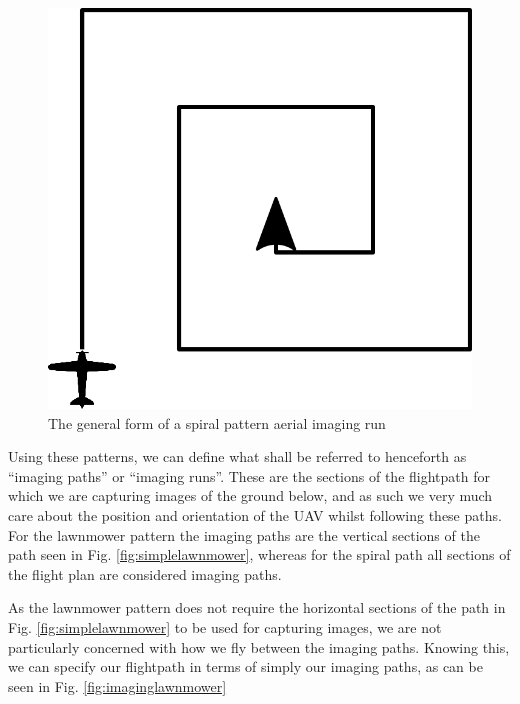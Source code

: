 \begin{figure}[htbp!] 
\centering    
\includegraphics[width=0.5\textheight]{SimpleSpiral}
\caption[Simple Spiral Pattern]{The general form of a spiral pattern aerial imaging run}
\label{fig:simplespiral}
\end{figure}

Using these patterns, we can define what shall be referred to henceforth as ``imaging paths'' or ``imaging runs''. These are the sections of the flightpath for which we are capturing images of the ground below, and as such we very much care about the position and orientation of the UAV whilst following these paths. For the lawnmower pattern the imaging paths are the vertical sections of the path seen in Fig. \ref{fig:simplelawnmower}, whereas for the spiral path all sections of the flight plan are considered imaging paths. 

As the lawnmower pattern does not require the horizontal sections of the path in Fig. \ref{fig:simplelawnmower} to be used for capturing images, we are not particularly concerned with how we fly between the imaging paths. Knowing this, we can specify our flightpath in terms of simply our imaging paths, as can be seen in Fig. \ref{fig:imaginglawnmower}

